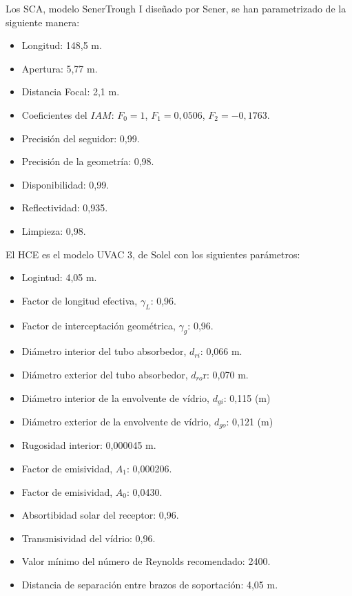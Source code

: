 \documentclass[12pt]{report} %
\begin{document}
Los SCA, modelo SenerTrough I diseñado por Sener, se han parametrizado de la siguiente manera:

\begin{itemize}
\item
  Longitud: 148,5 m.
\item
  Apertura: 5,77 m.
\item
  Distancia Focal: 2,1 m.
\item
  Coeficientes del \(IAM\): \(F_{0}=1\), \(F_{1}=0,0506\),
  \(F_{2}=-0,1763\).
\item
  Precisión del seguidor: 0,99.
\item
  Precisión de la geometría: 0,98.
\item
  Disponibilidad: 0,99.
\item
  Reflectividad: 0,935.
\item
  Limpieza: 0,98.
\end{itemize}

El HCE es el modelo UVAC 3, de Solel con los siguientes parámetros:

\begin{itemize}

\item
  Logintud: 4,05 m.
\item
  Factor de longitud efectiva, \(\gamma_L\): 0,96.
\item
  Factor de interceptación geométrica, \(\gamma_g\): 0,96.
\item
  Diámetro interior del tubo absorbedor, \(d_{ri}\): 0,066 m.
\item
  Diámetro exterior del tubo absorbedor, \(d_{ro}\)r: 0,070 m.
\item
  Diámetro interior de la envolvente de vídrio, \(d_{gi}\): 0,115 (m)
\item
  Diámetro exterior de la envolvente de vídrio, \(d_{go}\): 0,121 (m)
\item
  Rugosidad interior: 0,000045 m.
\item
  Factor de emisividad, \(A_1\): 0,000206.
\item
  Factor de emisividad, \(A_0\): 0,0430.
\item
  Absortibidad solar del receptor: 0,96.
\item
  Transmisividad del vídrio: 0,96.
\item
  Valor mínimo del número de Reynolds recomendado: 2400.
\item
  Distancia de separación entre brazos de soportación: 4,05 m.
\end{itemize}
\end{document}

